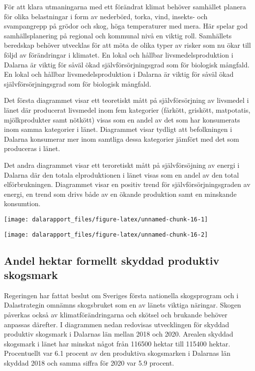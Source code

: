 \documentclass[
]{article}
\begin{document}
För att klara utmaningarna med ett förändrat klimat behöver samhället
planera för olika belastningar i form av nederbörd, torka, vind,
insekts- och svampangrepp på grödor och skog, höga temperaturer med
mera. Här spelar god samhällsplanering på regional och kommunal nivå en
viktig roll. Samhällets beredskap behöver utvecklas för att möta de
olika typer av risker som nu ökar till följd av förändringar i klimatet.
En lokal och hållbar livsmedelsproduktion i Dalarna är viktig för såväl
ökad självförsörjningsgrad som för biologisk mångfald. En lokal och
hållbar livsmedelsproduktion i Dalarna är viktig för såväl ökad
självförsörjningsgrad som för biologisk mångfald.

Det första diagrammet visar ett teoretiskt mått på självförsörjning av
livsmedel i länet där producerat livsmedel inom fem kategorier (fårkött,
griskött, matpotatis, mjölkprodukter samt nötkött) visas som en andel av
det som har konsumerats inom samma kategorier i länet. Diagrammet visar
tydligt att befolkningen i Dalarna konsumerar mer inom samtliga dessa
kategorier jämfört med det som produceras i länet.

Det andra diagrammet visar ett teroretiskt mått på självförsöjning av
energi i Dalarna där den totala elproduktionen i länet visas som en
andel av den total elförbrukningen. Diagrammet visar en positiv trend
för självförsörjningsgraden av energi, en trend som drivs både av en
ökande produktion samt en minskande konsumtion.

\begin{center}\texttt{[image: dalarapport\_files/figure-latex/unnamed-chunk-16-1]} \end{center}

\begin{center}\texttt{[image: dalarapport\_files/figure-latex/unnamed-chunk-16-2]} \end{center}

\hypertarget{andel-hektar-formellt-skyddad-produktiv-skogsmark}{%
\subsection{Andel hektar formellt skyddad produktiv
skogsmark}\label{andel-hektar-formellt-skyddad-produktiv-skogsmark}}

Regeringen har fattat beslut om Sveriges första nationella skogsprogram
och i Dalastrategin omnämns skogsbruket som en av länets viktiga
näringar. Skogen påverkas också av klimatförändringarna och skötsel och
brukande behöver anpassas därefter. I diagrammen nedan redovisas
utvecklingen för skyddad produktiv skogsmark i Dalarnas län mellan 2018
och 2020. Arealen skyddad skogsmark i länet har minskat något från
116500 hektar till 115400 hektar. Procentuellt var 6.1 procent av den
produktiva skogsmarken i Dalarnas län skyddad 2018 och samma siffra för
2020 var 5.9 procent.
\end{document}
